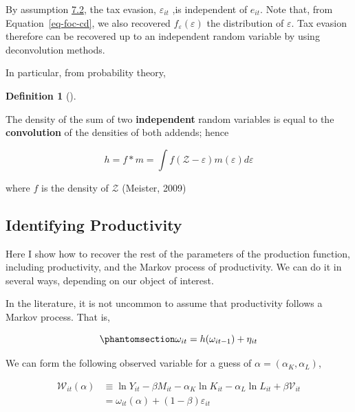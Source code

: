 \documentclass[
  12pt]{article}
\theoremstyle{definition}
\newtheorem{definition}{Definition}[section]
\theoremstyle{remark}
\newenvironment{fbx}[3]{\begin{tcolorbox}[enhanced, breakable,%
attach boxed title to top*={xshift=1.4pt},
boxed title style={boxrule=0.0mm, fuzzy shadow={1pt}{-1pt}{0mm}{0.1mm}{gray}, arc=.3em, rounded corners=east, sharp corners=west}, colframe=#1-color2, colbacktitle=#1-color1, colback = white, coltitle=black,  titlerule=0mm, toprule=0pt, bottomrule=.7pt, leftrule=.3em, rightrule=0pt, outer arc=.3em,  arc=0pt,	 sharp corners = east, left=.5em, bottomtitle=1mm, toptitle=1mm,title=\textbf{#2}\hspace{0.5em}{#3}]}
{\end{tcolorbox}}
\begin{document}
By assumption \hyperref[ass-ind]{7.2}, the tax evasion,
\(\varepsilon_{it}\) ,is independent of \(e_{it}\). Note that, from
Equation~\ref{eq-foc-cd}, we also recovered
\(f_{\varepsilon}(\varepsilon)\) the distribution of \(\varepsilon\).
Tax evasion therefore can be recovered up to an independent random
variable by using deconvolution methods.

In particular, from probability theory,

\begin{definition}[]\protect\hypertarget{def-conv}{}\label{def-conv}

\begin{fbx}{Definition}{Definition: }{Convolution}
\label{}
The density of the sum of two \textbf{independent} random variables is
equal to the \textbf{convolution} of the densities of both addends;
hence

\[
h = f*m = \int f(\mathcal Z - \varepsilon)m(\varepsilon)d\varepsilon
\]

where \(f\) is the density of \(\mathcal Z\) (Meister, 2009)

\end{fbx}

\end{definition}

\subsection{Identifying Productivity}\label{identifying-productivity}

Here I show how to recover the rest of the parameters of the production
function, including productivity, and the Markov process of
productivity. We can do it in several ways, depending on our object of
interest.

In the literature, it is not uncommon to assume that productivity
follows a Markov process. That is,

\begin{equation}\phantomsection\label{eq-prod-markov}{
    \omega_{it}=h(\omega_{it-1})+\eta_{it}
}\end{equation}

We can form the following observed variable for a guess of
\(\alpha=(\alpha_K,\alpha_L)\),

\[
\begin{aligned}
    \mathcal W_{it}(\alpha) & \equiv \ln Y_{it} - \beta M_{it}-\alpha_K \ln K_{it}-\alpha_L \ln L_{it}+\beta\mathcal{V}_{it}\\
    & = \omega_{it}(\alpha)+(1-\beta)\varepsilon_{it}
\end{aligned}
\]
\end{document}
